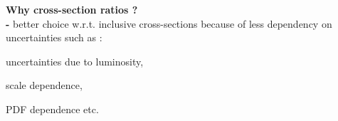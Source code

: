 \documentclass{beamer}
\begin{document}
\begin{frame}
\begin{itemize}
{\vspace{0mm}
\item {\bf Why cross-section ratios ?} \\
{\bf -} better choice w.r.t. inclusive cross-sections because of less dependency on uncertainties such as : \\}
\begin{itemize}
\tri
\item {\scriptsize uncertainties due to luminosity, 
\vspace{0.2mm}
\item scale dependence, 
\vspace{0.2mm}
\item PDF dependence etc.\\}
\end{itemize}
\ball
\end{itemize}
\end{frame}

\begin{frame}
\begin{center}
\vspace{13mm}
\textbf{\Large{}}
\end{center}
\end{frame}
\end{document}
